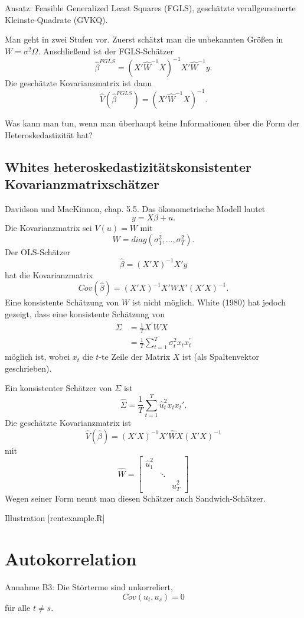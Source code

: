\documentclass{article}
\begin{document}
Ansatz: Feasible Generalized Least Squares (FGLS),
geschätzte verallgemeinerte Kleinste-Quadrate (GVKQ).

Man geht in zwei Stufen vor. Zuerst schätzt man die unbekannten Größen
in $W=\sigma ^{2}\Omega$. Anschließend ist der
FGLS-Schätzer 
\[ \hat{\beta}^{FGLS}=(X'\hat{W}^{-1}X)^{-1}X'\hat{W}^{-1}y. \]
Die geschätzte Kovarianzmatrix ist dann
\[ \hat{V}(\hat{\beta}^{FGLS})=(X'\hat{W}^{-1}X)^{-1}. \]

Was kann man tun, wenn man überhaupt keine Informationen über die
Form der Heteroskedastizität hat?

\subsection*{Whites heteroskedastizitätskonsistenter Kovarianzmatrixschätzer}

Davidson und MacKinnon, chap. 5.5. Das ökonometrische Modell lautet
\[ y=X\beta+u. \]
Die Kovarianzmatrix sei $V(u)=W$ mit
\[ W=diag(\sigma_1^2,\ldots ,\sigma_T^2).  \]
Der OLS-Schätzer
\[ \hat{\beta}=(X'X)^{-1}X'y \]
hat die Kovarianzmatrix
\[ Cov(\hat\beta)=(X'X)^{-1}X'WX'(X'X)^{-1}. \]
Eine konsistente Schätzung von $W$ ist nicht möglich. 
White (1980) hat jedoch gezeigt, dass eine konsistente Schätzung von
\begin{align*}
\Sigma &=\frac{1}{T}X^{\prime }WX \\
&=\frac{1}{T}\sum_{t=1}^{T}\sigma _{t}^{2}x_{t}x_{t}^{\prime }
\end{align*}
möglich ist, wobei $x_t$ die $t$-te Zeile der Matrix $X$ ist (als Spaltenvektor geschrieben).

Ein konsistenter Schätzer von $\Sigma$ ist
\[ \hat{\Sigma}=\frac{1}{T}\sum_{t=1}^{T}\hat{u}_t^2 x_t x_t'. \]
Die geschätzte Kovarianzmatrix ist
\[ \hat{V}(\hat\beta)=(X'X)^{-1}X'\hat{W}X(X'X)^{-1} \]
mit
\[ \hat{W}=\left[ 
\begin{array}{lll}
\hat{u}_{1}^{2} &  &  \\ 
& \ddots &  \\ 
&  & \hat{u}_{T}^{2}%
\end{array}%
\right] \]
Wegen seiner Form nennt man diesen Schätzer auch Sandwich-Schätzer.

Illustration [rentexample.R]

\section{Autokorrelation}

Annahme B3: Die Störterme sind unkorreliert,
\[ Cov(u_{t},u_{s})=0 \]
für alle $t\neq s$.
\end{document}
